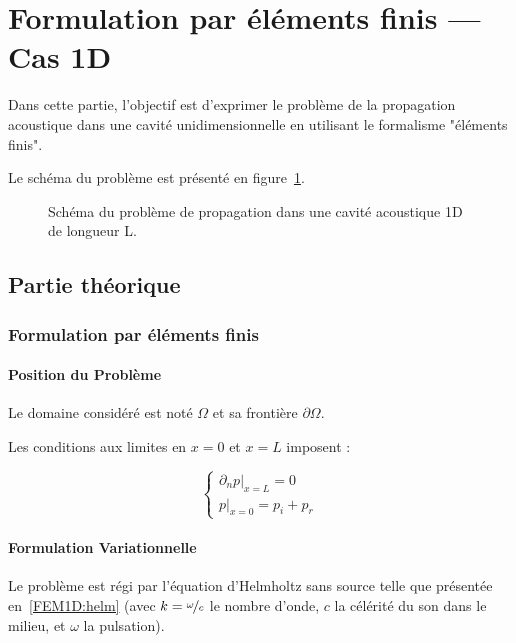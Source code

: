 \section{Formulation par éléments finis --- Cas 1D}

Dans cette partie, l'objectif est d'exprimer le problème de la propagation acoustique dans une cavité unidimensionnelle
en utilisant le formalisme "éléments finis".

Le schéma du problème est présenté en figure~\ref{fig:FEM:propa_1D}.

\begin{figure}[!ht]
	\centering
	
	\caption{\label{fig:FEM:propa_1D}Schéma du problème de propagation dans une cavité acoustique 1D de longueur L.}
\end{figure}

\subsection{Partie théorique}

\subsubsection{Formulation par éléments finis}
\label{FEM1D:subsection:linear}

\paragraph{Position du Problème}

Le domaine considéré est noté $\Omega$ et sa frontière $\partial\Omega$.

Les conditions aux limites en $x=0$ et $x=L$ imposent :

\begin{equation}
	\left\{\begin{array}{l}
	\left.\partial_np\right|_{x=L} = 0\\
	\left.p\right|_{x=0} = p_i+p_r
	\end{array}\right. \label{FEM1D:BC}
\end{equation}


\paragraph{Formulation Variationnelle}

Le problème est régi par l'équation d'Helmholtz sans source telle que présentée en~\eqref{FEM1D:helm} (avec $k =
\nicefrac{\omega}{c}$ le nombre d'onde, $c$ la célérité du son dans le milieu, et $\omega$ la pulsation).

